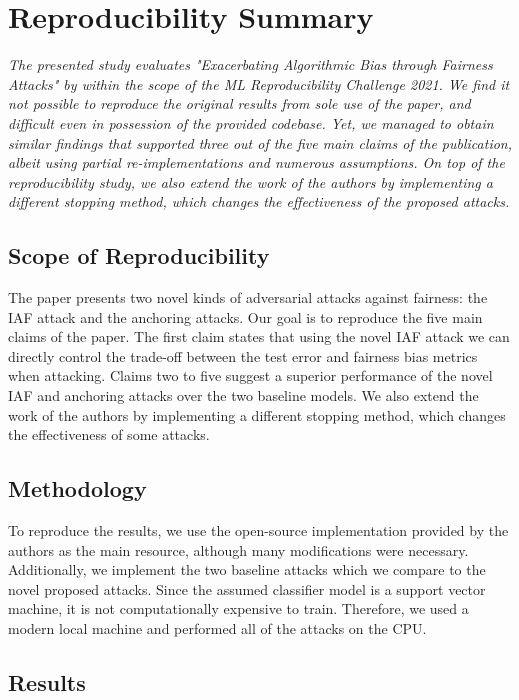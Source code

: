 \section*{\centering Reproducibility Summary}

\textit{The presented study evaluates "Exacerbating Algorithmic Bias through Fairness Attacks" by  within the scope of the ML Reproducibility Challenge 2021. We find it not possible to reproduce the original results from sole use of the paper, and difficult even in possession of the provided codebase. Yet, we managed to obtain similar findings that supported three out of the five main claims of the publication, albeit using partial re-implementations and numerous assumptions. On top of the reproducibility study, we also extend the work of the authors by implementing a different stopping method, which changes the effectiveness of the proposed attacks.}

\subsection*{Scope of Reproducibility}

The paper presents two novel kinds of adversarial attacks against fairness: the IAF attack and the anchoring attacks. Our goal is to reproduce the five main claims of the paper. The first claim states that using the novel IAF attack we can directly control the trade-off between the test error and fairness bias metrics when attacking. Claims two to five suggest a superior performance of the novel IAF and anchoring attacks over the two baseline models. We also extend the work of the authors by implementing a different stopping method, which changes the effectiveness of some attacks. 

\subsection*{Methodology}

To reproduce the results, we use the open-source implementation provided by the authors as the main resource, although many modifications were necessary. Additionally, we implement the two baseline attacks which we compare to the novel proposed attacks. Since the assumed classifier model is a support vector machine, it is not computationally expensive to train. Therefore, we used a modern local machine and performed all of the attacks on the CPU. 

\subsection*{Results}

